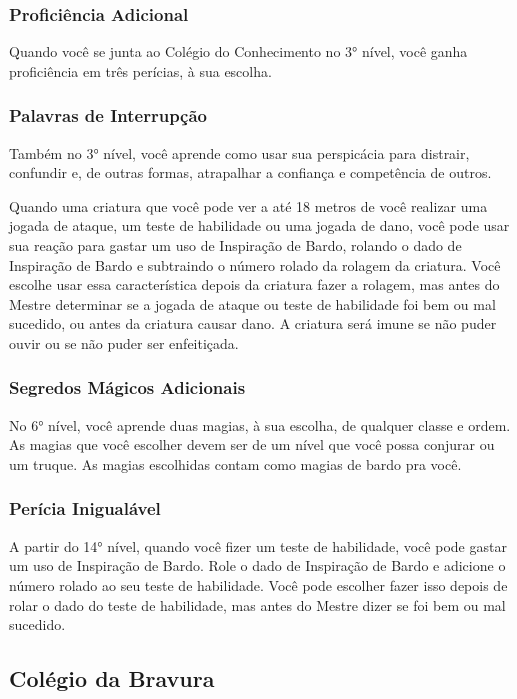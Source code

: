 \documentclass{RPG_Adventure}[2021/10/20]
\begin{document}
\begin{multicols}{2}
\subsubsection*{Proficiência Adicional}%

Quando você se junta ao Colégio do Conhecimento no 3° nível, você ganha
proficiência em três perícias, à sua escolha.

\subsubsection*{Palavras de Interrupção}%

Também no 3° nível, você aprende como usar sua perspicácia para distrair,
confundir e, de outras formas, atrapalhar a confiança e competência de outros.

Quando uma criatura que você pode ver a até 18 metros de você realizar uma
jogada de ataque, um teste de habilidade ou uma jogada de dano, você pode usar
sua reação para gastar um uso de Inspiração de Bardo, rolando o dado de
Inspiração de Bardo e subtraindo o número rolado da rolagem da criatura. Você
escolhe usar essa característica depois da criatura fazer a rolagem, mas antes
do Mestre determinar se a jogada de ataque ou teste de habilidade foi bem ou mal
sucedido, ou antes da criatura causar dano. A criatura será imune se não puder
ouvir ou se não puder ser enfeitiçada.

\subsubsection*{Segredos Mágicos Adicionais}%

No 6° nível, você aprende duas magias, à sua escolha, de qualquer classe e
ordem. As magias que você escolher devem ser de um nível que você possa conjurar
ou um truque. As magias escolhidas contam como magias de bardo pra você.

\subsubsection*{Perícia Inigualável}%

A partir do 14° nível, quando você fizer um teste de habilidade, você pode
gastar um uso de Inspiração de Bardo. Role o dado de Inspiração de Bardo e
adicione o número rolado ao seu teste de habilidade. Você pode escolher fazer
isso depois de rolar o dado do teste de habilidade, mas antes do Mestre dizer se
foi bem ou mal sucedido.

\subsection*{Colégio da Bravura}%


\end{multicols}
\end{document}

